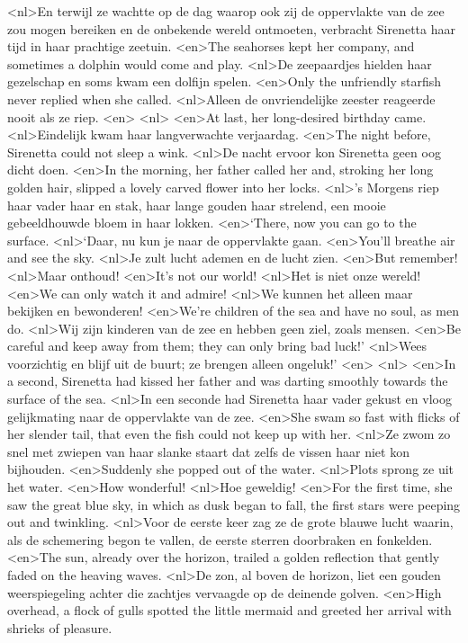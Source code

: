 <nl>En terwijl ze wachtte op de dag waarop ook zij de oppervlakte van de zee zou mogen bereiken en de onbekende wereld ontmoeten, verbracht Sirenetta haar tijd in haar prachtige zeetuin.
<en>The seahorses kept her company, and sometimes a dolphin would come and play.
<nl>De zeepaardjes hielden haar gezelschap en soms kwam een dolfijn spelen.
<en>Only the unfriendly starfish never replied when she called.
<nl>Alleen de onvriendelijke zeester reageerde nooit als ze riep.
<en>
<nl>
<en>At last, her long-desired birthday came.
<nl>Eindelijk kwam haar langverwachte verjaardag.
<en>The night before, Sirenetta could not sleep a wink.
<nl>De nacht ervoor kon Sirenetta geen oog dicht doen.
<en>In the morning, her father called her and, stroking her long golden hair, slipped a lovely carved flower into her locks.
<nl>'s Morgens riep haar vader haar en stak, haar lange gouden haar strelend, een mooie gebeeldhouwde bloem in haar lokken.
<en>`There, now you can go to the surface.
<nl>`Daar, nu kun je naar de oppervlakte gaan.
<en>You’ll breathe air and see the sky.
<nl>Je zult lucht ademen en de lucht zien.
<en>But remember!
<nl>Maar onthoud!
<en>It’s not our world!
<nl>Het is niet onze wereld!
<en>We can only watch it and admire!
<nl>We kunnen het alleen maar bekijken en bewonderen!
<en>We’re children of the sea and have no soul, as men do.
<nl>Wij zijn kinderen van de zee en hebben geen ziel, zoals mensen.
<en>Be careful and keep away from them; they can only bring bad luck!' 
<nl>Wees voorzichtig en blijf uit de buurt; ze brengen alleen ongeluk!'
<en>
<nl>
<en>In a second, Sirenetta had kissed her father and was darting smoothly towards the surface of the sea.
<nl>In een seconde had Sirenetta haar vader gekust en vloog gelijkmating naar de oppervlakte van de zee.
<en>She swam so fast with flicks of her slender tail, that even the fish could not keep up with her.
<nl>Ze zwom zo snel met zwiepen van haar slanke staart dat zelfs de vissen haar niet kon bijhouden.
<en>Suddenly she popped out of the water.
<nl>Plots sprong ze uit het water.
<en>How wonderful!
<nl>Hoe geweldig!
<en>For the first time, she saw the great blue sky, in which as dusk began to fall, the first stars were peeping out and twinkling.
<nl>Voor de eerste keer zag ze de grote blauwe lucht waarin, als de schemering begon te vallen, de eerste sterren doorbraken en fonkelden.
<en>The sun, already over the horizon, trailed a golden reflection that gently faded on the heaving waves.
<nl>De zon, al boven de horizon, liet een gouden weerspiegeling achter die zachtjes vervaagde op de deinende golven.
<en>High overhead, a flock of gulls spotted the little mermaid and greeted her arrival with shrieks of pleasure.
